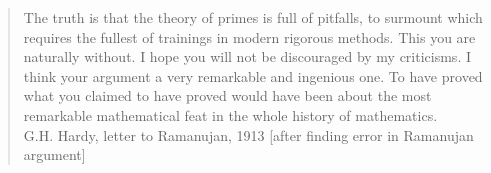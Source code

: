 \documentclass[11pt]{article}
\begin{document}
\begin{quote}
The truth is that the theory of primes is full of pitfalls, to surmount which requires the 
fullest of trainings in modern rigorous methods. This you are naturally without. I hope 
you will not be discouraged by my criticisms. I think your argument a very remarkable 
and ingenious one. To have proved what you claimed to have proved would have been
 about the most remarkable mathematical feat in the whole history of mathematics.
\\ G.H. Hardy, letter to Ramanujan, 1913 [after finding error in Ramanujan argument]
\end{quote}
\end{document}
